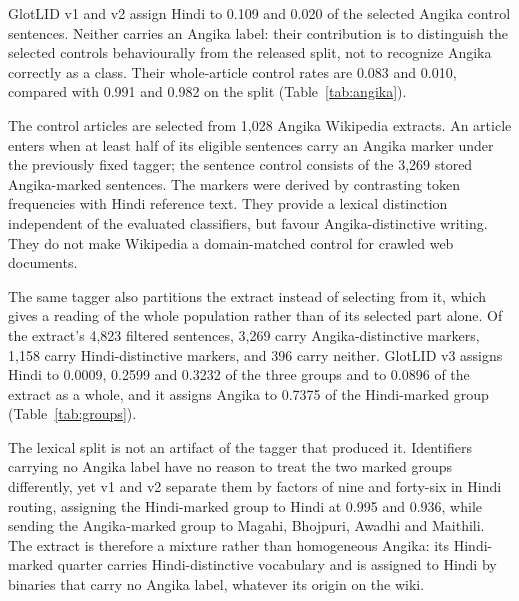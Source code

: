 \documentclass[final]{clv2025}
\newcommand{\fitexhibit}[1]{\sbox{\exhibitbox}{}\ifdim\wd\exhibitbox>\linewidth\resizebox{\linewidth}{!}{\usebox{\exhibitbox}}\else\usebox{\exhibitbox}\fi}
\newcommand{\exhibit}[1]{\fitexhibit{tables/#1.tex}}
\begin{document}
GlotLID v1 and v2 assign Hindi to 0.109 and 0.020 of the selected Angika control sentences. Neither carries an Angika label: their contribution is to distinguish the selected controls behaviourally from the released split, not to recognize Angika correctly as a class. Their whole-article control rates are 0.083 and 0.010, compared with 0.991 and 0.982 on the split (Table~\ref{tab:angika}).

The control articles are selected from 1,028 Angika Wikipedia extracts. An article enters when at least half of its eligible sentences carry an Angika marker under the previously fixed tagger; the sentence control consists of the 3,269 stored Angika-marked sentences. The markers were derived by contrasting token frequencies with Hindi reference text. They provide a lexical distinction independent of the evaluated classifiers, but favour Angika-distinctive writing. They do not make Wikipedia a domain-matched control for crawled web documents.

The same tagger also partitions the extract instead of selecting from it, which gives a reading of the whole population rather than of its selected part alone. Of the extract's 4{,}823 filtered sentences, 3{,}269 carry Angika-distinctive markers, 1{,}158 carry Hindi-distinctive markers, and 396 carry neither. GlotLID v3 assigns Hindi to 0.0009, 0.2599 and 0.3232 of the three groups and to 0.0896 of the extract as a whole, and it assigns Angika to 0.7375 of the Hindi-marked group (Table~\ref{tab:groups}).

The lexical split is not an artifact of the tagger that produced it. Identifiers carrying no Angika label have no reason to treat the two marked groups differently, yet v1 and v2 separate them by factors of nine and forty-six in Hindi routing, assigning the Hindi-marked group to Hindi at 0.995 and 0.936, while sending the Angika-marked group to Magahi, Bhojpuri, Awadhi and Maithili. The extract is therefore a mixture rather than homogeneous Angika: its Hindi-marked quarter carries Hindi-distinctive vocabulary and is assigned to Hindi by binaries that carry no Angika label, whatever its origin on the wiki.

\begin{table}[tb]\centering\small\exhibit{angika_groups}
\caption{The 1,028-article Angika Wikipedia extract partitioned by the fixed lexical tagger, with the share of each group that GlotLID v1 and v3 assign to Hindi and to Angika. Version 1 carries no Angika label, so its Angika column is empty by construction; its separation of the first two groups shows that the lexical split is not an artifact of the tagger. Version 2's rates to Hindi on the three groups are 0.020, 0.936 and 0.667.}
\label{tab:groups}
\end{table}
\end{document}
